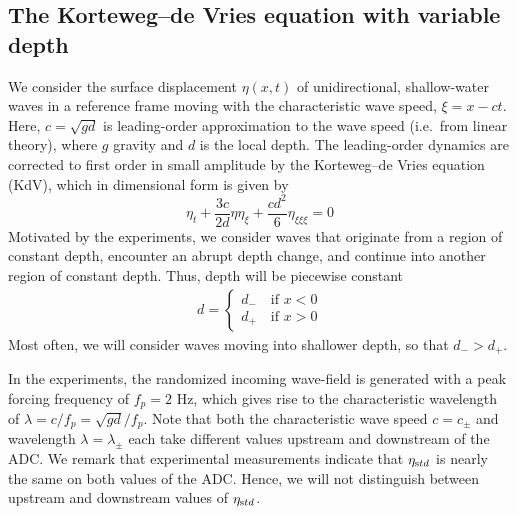 \documentclass[11pt]{article}
\newcommand{\freqp}{f_p}
\newcommand{\etastd}{\eta_{\text std}}
\newcommand{\depth}{d}
\newcommand{\dup}{\depth_{-}}
\newcommand{\ddn}{\depth_{+}}
\newcommand{\lam}{\lambda}
\newcommand{\lamupdn}{\lam_{\pm}}
\begin{document}
\subsection{The Korteweg–de Vries equation with variable depth}

We consider the surface displacement $\eta(x,t)$ of unidirectional, shallow-water waves in a reference frame moving with the characteristic wave speed, $\xi = x - ct$. Here, $c = \sqrt{g \depth}$ is leading-order approximation to the wave speed (i.e.~from linear theory), where $g$ gravity and $\depth$ is the local depth.
The leading-order dynamics are corrected to first order in small amplitude by the Korteweg–de Vries equation (KdV), which in dimensional form is given by \cite{whitham2011linear}
\begin{equation}
\label{KdV}
\eta_t + \frac{3 c}{2 \depth} \eta \eta_{\xi} + \frac{c \depth^2}{6} \eta_{\xi \xi \xi} = 0
\end{equation}
Motivated by the experiments, we consider waves that originate from a region of constant depth, encounter an abrupt depth change, and continue into another region of constant depth. Thus, depth will be piecewise constant
\begin{align}
\depth = 
\begin{cases}
\dup \quad \mbox{if } x<0 \\
\ddn \quad \mbox{if } x>0
\end{cases}
\end{align}
Most often, we will consider waves moving into shallower depth, so that $\dup > \ddn$. 

In the experiments, the randomized incoming wave-field is generated with a peak forcing frequency of $\freqp = 2$ Hz, which gives rise to the characteristic wavelength of $\lam = c/\freqp = \sqrt{g \depth} / \freqp$. Note that both the characteristic wave speed $c = c_{\pm}$ and wavelength $\lam = \lamupdn$ each take different values upstream and downstream of the ADC. We remark that experimental measurements indicate that $\etastd$ is nearly the same on both values of the ADC. Hence, we will not distinguish between upstream and downstream values of $\etastd$.

 
\end{document}
